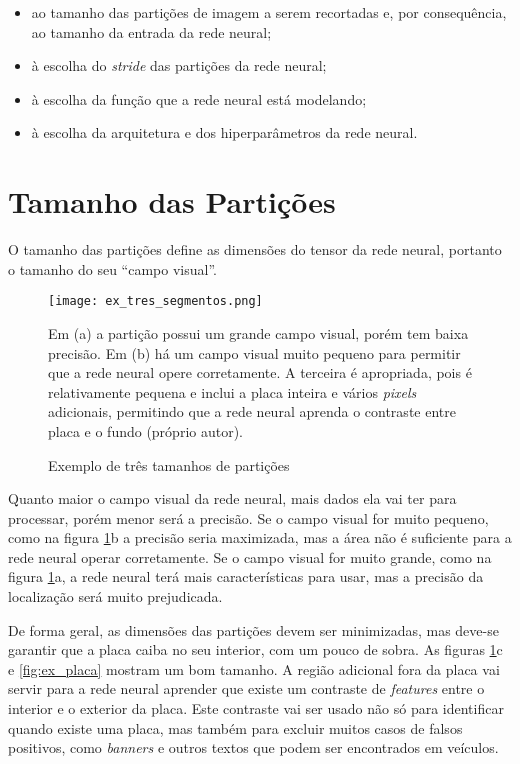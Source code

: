\begin{itemize}
\item ao tamanho das partições de imagem a serem recortadas e, por
	consequência, ao tamanho da entrada da rede neural;
\item à escolha do \emph{stride} das partições da rede neural;
\item à escolha da função que a rede neural está modelando;
\item à escolha da arquitetura e dos hiperparâmetros da rede neural.
\end{itemize}

\section{Tamanho das Partições}
O tamanho das partições define as dimensões do tensor da rede neural, portanto
o tamanho do seu ``campo visual''.


\begin{figure}[!htb]
	\centering
	\texttt{[image: ex\_tres\_segmentos.png]}
	\caption{Exemplo de três tamanhos de partições}
	\label{fig:ex_tres_segmentos}
	Em (a) a partição possui um grande campo visual, porém tem baixa precisão.
	Em (b) há um campo visual muito pequeno para permitir que a rede neural
	opere corretamente. A terceira é apropriada, pois é relativamente pequena e
	inclui a placa inteira e vários \emph{pixels} adicionais, permitindo que a
	rede neural aprenda o contraste entre placa e o fundo (próprio autor).
\end{figure}

Quanto maior o campo visual da rede neural, mais dados ela vai ter para
processar, porém menor será a precisão. Se o campo visual for muito pequeno,
como na figura \ref{fig:ex_tres_segmentos}b a precisão seria maximizada,
mas a área não é suficiente para a rede neural operar corretamente. Se
o campo visual for muito grande, como na figura \ref{fig:ex_tres_segmentos}a,
a rede neural terá mais características para usar, mas a precisão da
localização será muito prejudicada.

De forma geral, as dimensões das partições devem ser minimizadas, mas deve-se
garantir que a placa caiba no seu interior, com um pouco de
sobra. As figuras \ref{fig:ex_tres_segmentos}c e \ref{fig:ex_placa} mostram
um bom tamanho. A região adicional fora da placa vai servir para a rede
neural aprender que existe um contraste de \emph{features} entre o
interior e o exterior da placa. Este contraste vai ser usado não só para
identificar quando existe uma placa, mas também para excluir muitos casos de
falsos positivos, como \emph{banners} e outros textos que podem ser
encontrados em veículos.

